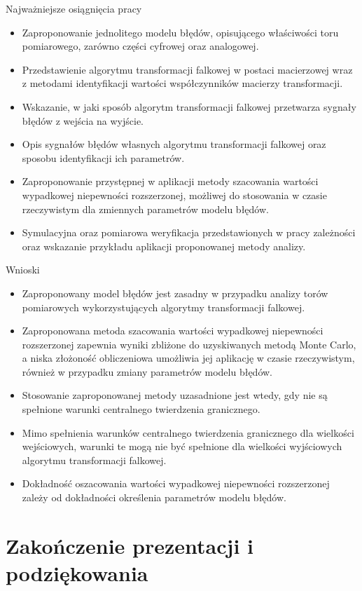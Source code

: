 \documentclass[12pt, polish, aspectratio = 169]{slides}
\begin{document}

\begin{frame}{Najważniejsze osiągnięcia pracy}
\begin{itemize}
\item Zaproponowanie jednolitego modelu błędów, opisującego właściwości toru pomiarowego, zarówno części cyfrowej oraz analogowej.
\item Przedstawienie algorytmu transformacji falkowej w postaci macierzowej wraz z metodami identyfikacji wartości współczynników macierzy transformacji.
\item Wskazanie, w jaki sposób algorytm transformacji falkowej przetwarza sygnały błędów z wejścia na wyjście.
\item Opis sygnałów błędów własnych algorytmu transformacji falkowej oraz sposobu identyfikacji ich parametrów.
\item Zaproponowanie przystępnej w aplikacji metody szacowania wartości wypadkowej niepewności rozszerzonej, możliwej do stosowania w czasie rzeczywistym dla zmiennych parametrów modelu błędów.
\item Symulacyjna oraz pomiarowa weryfikacja przedstawionych w pracy zależności oraz wskazanie przykładu aplikacji proponowanej metody analizy.
\end{itemize}
\end{frame}

\begin{frame}{Wnioski}
\begin{itemize}
\item Zaproponowany model błędów jest zasadny w przypadku analizy torów pomiarowych wykorzystujących algorytmy transformacji falkowej.
\item Zaproponowana metoda szacowania wartości wypadkowej niepewności rozszerzonej zapewnia wyniki zbliżone do uzyskiwanych metodą Monte Carlo, a niska złożoność obliczeniowa umożliwia jej aplikację w czasie rzeczywistym, również w przypadku zmiany parametrów modelu błędów.
\item Stosowanie zaproponowanej metody uzasadnione jest wtedy, gdy nie są spełnione warunki centralnego twierdzenia granicznego.
\item Mimo spełnienia warunków centralnego twierdzenia granicznego dla wielkości wejściowych, warunki te mogą nie być spełnione dla wielkości wyjściowych algorytmu transformacji falkowej.
\item Dokładność oszacowania wartości wypadkowej niepewności rozszerzonej zależy od dokładności określenia parametrów modelu błędów.
\end{itemize}
\end{frame}

\section*{Zakończenie prezentacji i podziękowania}

\begin{frame}[plain]
\lastpage
\end{frame}
\end{document}
